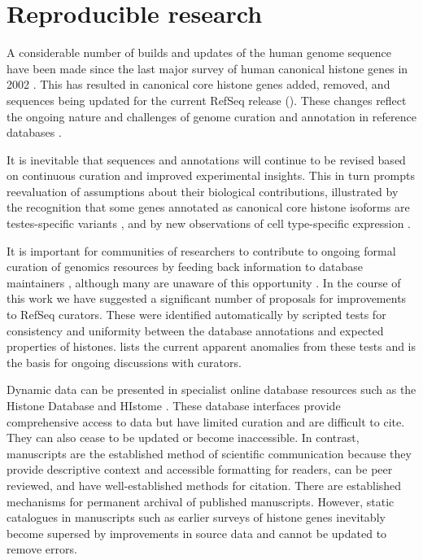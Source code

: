 \section{Reproducible research}

  A considerable number of builds and updates of the human genome sequence have been made
  since the last major survey of human canonical histone genes in 2002 \citep{Marzluff02}.
  This has resulted in
  \AddedSinceReference{} canonical core histone genes added,
  \RemovedSinceReference{} removed,
  and \SequencesUpdatedSinceReference{} sequences 
  being updated for the current RefSeq release ().
  These changes reflect the ongoing nature and challenges of
  genome curation and annotation in reference databases \citep{BorkKoonin1998}.

  It is inevitable that sequences and annotations will continue to be revised
  based on continuous curation and improved experimental insights.
  This in turn prompts reevaluation of assumptions about their biological contributions,
  illustrated by the recognition that some genes
  annotated as canonical core histone isoforms are testes-specific variants \citep{Talbert2012},
  and by new observations of cell type-specific expression \citep{Molden2015}.

  It is important for communities of researchers to contribute
  to ongoing formal curation of genomics resources
  by feeding back information to database maintainers \citep{SteinNRG2001},
  although many are unaware of this opportunity \citep{HollidaySPR2015}.
  In the course of this work we have suggested a significant number of proposals
  for improvements to RefSeq curators.
  These were identified automatically by scripted tests for consistency and uniformity
  between the database annotations and expected properties of histones.
   lists the current apparent anomalies from these tests
  and is the basis for ongoing discussions with curators.

  Dynamic data can be presented in specialist online database resources
  such as the Histone Database \citep{HistoneDB2016} and HIstome \citep{HIstome2012}.
  These database interfaces provide comprehensive access to data
  but have limited curation and are difficult to cite.
  They can also cease to be updated or become inaccessible.
  In contrast, manuscripts are the established method of scientific communication
  because they provide descriptive context and accessible formatting for readers,
  can be peer reviewed, and have well-established methods for citation.
  There are established mechanisms for permanent archival of published manuscripts.
  However, static catalogues in manuscripts
  such as earlier surveys of histone genes \citep{AlbigHumangen1997,Marzluff02}
  inevitably become supersed by improvements in source data and cannot be updated to remove errors.

